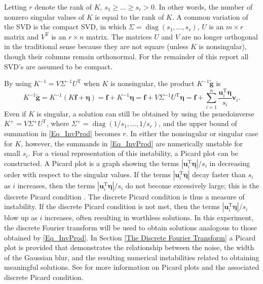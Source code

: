 \documentclass[12pt]{article}
\newcommand{\gnoise}{\widetilde{\mathbf{g}}}
\newcommand{\kmat}{K}	%
\newcommand{\fdis}{\mathbf{f}}
\newcommand{\trans}{\mathrm{T}}	%
\newcommand{\diag}{\operatorname{diag}}
\newcommand{\noise}{\bm{\eta}}	%
\newcommand{\singular}{s}	%
\newcommand{\LSV}{\mathbf{u}}	%
\newcommand{\RSV}{\mathbf{v}}	%
\begin{document}
Letting $r$ denote the rank of $\kmat$,  $\singular_1 \geq \ldots \geq \singular_r > 0$. In other words, the number of nonzero singular values of $\kmat$ is equal to the rank of $\kmat$.  A common variation of the SVD is the compact SVD, in which $\Sigma = \diag(\singular_1,\ldots,\singular_r)$, $U$ is an $m \times r$ matrix and $V^\trans$ is an $r \times n$ matrix. The matrices $U$ and $V$ are no longer orthogonal in the traditional sense because they are not square (unless $\kmat$ is nonsingular), though their columns remain orthonormal. For the remainder of this report all SVD's are assumed to be compact.  \par 
By using $\kmat^{-1} = V\Sigma^{-1}U^\trans$ when $\kmat$ is nonsingular, the product $\kmat^{-1}\gnoise$ is
\begin{equation}
\kmat^{-1}\gnoise = \kmat^{-1}\left(\kmat\fdis + \noise\right) = \fdis + \kmat^{-1}\noise = \fdis + V\Sigma^{-1}{U^\trans}\noise = \fdis + \sum_{i = 1}^n \frac{{\LSV^\trans_i}\noise}{\singular_i}\RSV_i. 
\label{Eq_InvProd}
\end{equation}
Even if $\kmat$ is singular, a solution can still be obtained by using the psuedoinverse $\kmat^+ = V{\Sigma^+}U^\trans$, where $\Sigma^+ = \diag(1/\singular_1,\ldots,1/\singular_r)$, and the upper bound of summation in \eqref{Eq_InvProd} becomes $r$. In either the nonsingular or singular case for $\kmat$, however, the summands in \eqref{Eq_InvProd} are numerically unstable for small $\singular_i$. For a visual representation of this instability, a Picard plot can be constructed. A Picard plot is a graph showing the terms $|\LSV^\trans_i\noise|/\singular_i$ in decreasing order with respect to the singular values. If the terms $|\LSV^\trans_i\noise|$ decay faster than $\singular_i$ as $i$ increases, then the terms $|\LSV^\trans_i\noise|/\singular_i$ do not become excessively large; this is the discrete Picard condition \cite{ABT}. The discrete Picard condition is thus a measure of instability. If the discrete Picard condition is not met, then the terms $|\LSV^\trans_i\noise|/\singular_i$ blow up as $i$ increases, often resulting in worthless solutions. In this experiment, the discrete Fourier transform will be used to obtain solutions analogous to those obtained by \eqref{Eq_InvProd}. In Section \ref{The Discrete Fourier Transform} a Picard plot is provided that demonstrates the relationship between the noise, the width of the Gaussian blur, and the resulting numerical instabilities related to obtaining meaningful solutions. See \cite{Hansen1990} for more information on Picard plots and the associated discrete Picard condition. \par 
\end{document}
